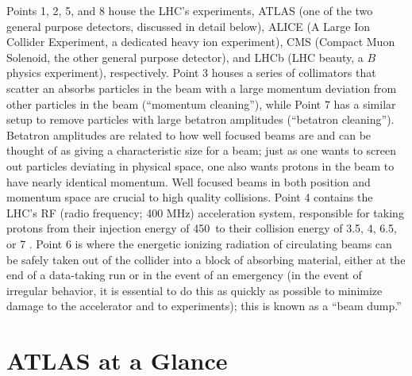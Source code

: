 \begin{landscape}
\begin{figure}[!htbp]\captionsetup{justification=centering}
  \centering
  \begin{subfigure}[t]{0.4950000\linewidth}\centering\texttt{[image: figures/atlas/lhcschematic]}}\caption{}\end{subfigure}
  \begin{subfigure}[t]{0.4950000\linewidth}\centering\texttt{[image: figures/atlas/fig\_LHC\_area\_overview]}}\caption{}\end{subfigure}
  \caption{Schematic and detailed views of the LHC ring. IC: \cite{lhccartoon}, \cite{lhcdetail}}
  \label{fig:lhcring}
\end{figure}
\end{landscape}

Points 1, 2, 5, and 8 house the LHC's experiments, ATLAS (one of the two general purpose detectors, discussed in detail below), ALICE (A Large Ion Collider Experiment, a dedicated heavy ion experiment), CMS (Compact Muon Solenoid, the other general purpose detector), and LHCb (LHC beauty, a $B$ physics experiment), respectively.  Point 3 houses a series of collimators that scatter an absorbs particles in the beam with a large momentum deviation from other particles in the beam (``momentum cleaning''), while Point 7 has a similar setup to remove particles with large betatron amplitudes (``betatron cleaning'').  Betatron amplitudes are related to how well focused beams are and can be thought of as giving a characteristic size for a beam; just as one wants to screen out particles deviating in physical space, one also wants protons in the beam to have nearly identical  momentum.  Well focused beams in both position and momentum space are crucial to high quality collisions.  Point 4 contains the LHC's RF (radio frequency; 400 MHz) acceleration system, responsible for taking protons from their injection energy of 450 \GeV\,to their collision energy of 3.5, 4, 6.5, or 7 \TeV.  Point 6 is where the energetic ionizing radiation of circulating beams can be safely taken out of the collider into a block of absorbing material, either at the end of a data-taking run or in the event of an emergency (in the event of irregular behavior, it is essential to do this as quickly as possible to minimize damage to the accelerator and to experiments); this is known as a ``beam dump.''

\section{ATLAS at a Glance}
